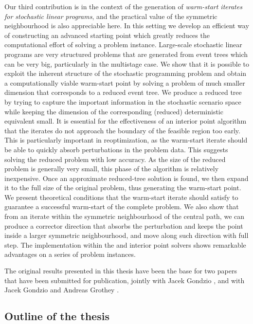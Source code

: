 Our third contribution is in the context of the generation of 
{\em warm-start iterates for stochastic linear programs}, 
and the practical value of the 
symmetric neighbourhood is also appreciable here.
In this setting we develop an efficient way of constructing 
an advanced starting point which greatly reduces the computational
effort of solving a problem instance.
Large-scale stochastic linear programs are very structured problems
that are generated from event trees which can be very big, particularly
in the multistage case.
We show that it is possible to exploit the inherent structure of 
the stochastic programming problem and obtain a computationally viable
warm-start point by solving a problem of much smaller
dimension that corresponds to a reduced event tree.
We produce a reduced tree by trying to capture the 
important information in the stochastic scenario space while keeping 
the dimension of the corresponding (reduced) deterministic equivalent small.
It is essential for the effectiveness of an interior point algorithm
that the iterates do not approach the boundary of the
feasible region too early.
This is particularly important in reoptimization, 
as the warm-start iterate should be able to quickly absorb
perturbations in the problem data.
This suggests solving the reduced problem with low accuracy.
As the size of the reduced problem is generally very small,
this phase of the algorithm is relatively inexpensive.
Once an approximate reduced-tree solution is found,
we then expand it to the full size of
the original problem, thus generating the warm-start point.
We present theoretical conditions that the warm-start iterate
should satisfy to guarantee a successful warm-start of the complete 
problem. 
We also show that from an iterate within the symmetric neighbourhood
of the central path, we can produce
a corrector direction that absorbs the perturbation and 
keeps the point inside a larger symmetric neighbourhood,
and move along such direction with full step.
The implementation within the \HOPDM and \OOPS interior point solvers 
shows remarkable advantages on a series of problem instances.

The original results presented in this thesis have been the base for two
papers that have been submitted for publication, jointly with
Jacek Gondzio \cite{ColomboGondzio05}, and with Jacek Gondzio and 
Andreas Grothey \cite{ColomboGondzioGrothey06}.

%
%
\subsection*{Outline of the thesis}

